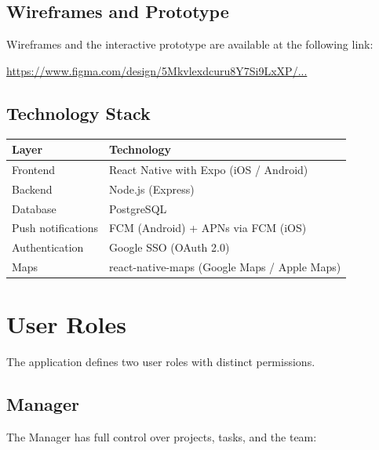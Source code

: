 \documentclass[12pt,a4paper]{article}
\begin{document}
\subsection*{Wireframes and Prototype}

Wireframes and the interactive prototype are available at the following link:\\
\begin{sloppypar}
\url{https://www.figma.com/design/5Mkvlexdcuru8Y7Si9LxXP/...}
\end{sloppypar} %

\subsection*{Technology Stack}
 
\begin{tabular}{ll}
\toprule
\textbf{Layer} & \textbf{Technology} \\
\midrule
Frontend           & React Native with Expo (iOS / Android) \\
Backend            & Node.js (Express) \\
Database           & PostgreSQL \\
Push notifications & FCM (Android) + APNs via FCM (iOS) \\
Authentication     & Google SSO (OAuth 2.0) \\
Maps               & react-native-maps (Google Maps / Apple Maps) \\
\bottomrule
\end{tabular}

\section{User Roles}

The application defines two user roles with distinct permissions.

\subsection{Manager}

The Manager has full control over projects, tasks, and the team:
\end{document}
